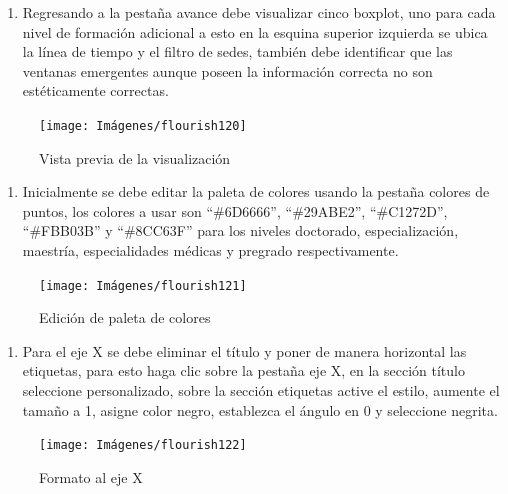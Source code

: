 \documentclass[
]{book}
\providecommand{\tightlist}{%
  \setlength{\itemsep}{0pt}\setlength{\parskip}{0pt}}
\begin{document}
\begin{enumerate}
\def\labelenumi{\arabic{enumi}.}
\setcounter{enumi}{1}
\tightlist
\item
  Regresando a la pestaña avance debe visualizar cinco boxplot, uno para cada nivel de formación adicional a esto en la esquina superior izquierda se ubica la línea de tiempo y el filtro de sedes, también debe identificar que las ventanas emergentes aunque poseen la información correcta no son estéticamente correctas.
\end{enumerate}

\begin{figure}

{\centering \texttt{[image: Imágenes/flourish120]} 

}

\caption{Vista previa de la visualización}\label{fig:paso2oxplotflourish-fig}
\end{figure}

\begin{enumerate}
\def\labelenumi{\arabic{enumi}.}
\setcounter{enumi}{2}
\tightlist
\item
  Inicialmente se debe editar la paleta de colores usando la pestaña colores de puntos, los colores a usar son ``\#6D6666'', ``\#29ABE2'', ``\#C1272D'', ``\#FBB03B'' y ``\#8CC63F'' para los niveles doctorado, especialización, maestría, especialidades médicas y pregrado respectivamente.
\end{enumerate}

\begin{figure}

{\centering \texttt{[image: Imágenes/flourish121]} 

}

\caption{Edición de paleta de colores}\label{fig:paso3boxplotflourish-fig}
\end{figure}

\begin{enumerate}
\def\labelenumi{\arabic{enumi}.}
\setcounter{enumi}{3}
\tightlist
\item
  Para el eje X se debe eliminar el título y poner de manera horizontal las etiquetas, para esto haga clic sobre la pestaña eje X, en la sección título seleccione personalizado, sobre la sección etiquetas active el estilo, aumente el tamaño a 1, asigne color negro, establezca el ángulo en 0 y seleccione negrita.
\end{enumerate}

\begin{figure}

{\centering \texttt{[image: Imágenes/flourish122]} 

}

\caption{Formato al eje X}\label{fig:paso4boxplotflourish-fig}
\end{figure}
\end{document}
